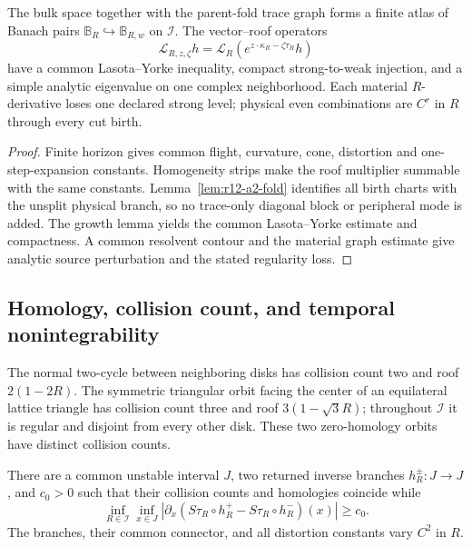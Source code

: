 \begin{theorem}
\label{thm:r12-a2-bundle}
The bulk space together with the parent-fold trace graph forms a finite
atlas of Banach pairs $\mathbb B_R\hookrightarrow\mathbb B_{R,w}$ on
$\mathcal I$.  The vector--roof operators
\[
 \mathcal L_{R,z,\zeta}h
 =\mathcal L_R(e^{z\cdot\kappa_R-\zeta\tau_R}h)
\]
have a common Lasota--Yorke inequality, compact strong-to-weak injection, and
a simple analytic eigenvalue on one complex neighborhood.  Each material
$R$-derivative loses one declared strong level; physical even combinations
are $C^r$ in $R$ through every cut birth.
\end{theorem}

\begin{proof}
Finite horizon gives common flight, curvature, cone, distortion and
one-step-expansion constants.  Homogeneity strips make the roof multiplier
summable with the same constants.  Lemma~\ref{lem:r12-a2-fold} identifies all
birth charts with the unsplit physical branch, so no trace-only diagonal block
or peripheral mode is added.  The growth lemma yields the common
Lasota--Yorke estimate and compactness.  A common resolvent contour and the
material graph estimate give analytic source perturbation and the stated
regularity loss.
\end{proof}

\subsection{Homology, collision count, and temporal nonintegrability}

The normal two-cycle between neighboring disks has collision count two and
roof $2(1-2R)$.  The symmetric triangular orbit facing the center of an
equilateral lattice triangle has collision count three and roof
$3(1-\sqrt3R)$; throughout $\mathcal I$ it is regular and disjoint from every
other disk.  These two zero-homology orbits have distinct collision counts.

\begin{lemma}
\label{lem:r12-a2-uni}
There are a common unstable interval $J$, two returned inverse branches
$h_R^\pm:J\to J$, and $c_0>0$ such that their collision counts and homologies
coincide while
\[
 \inf_{R\in\mathcal I}\inf_{x\in J}
 \left|\partial_x(S\tau_R\circ h_R^+ -S\tau_R\circ h_R^-)(x)\right|
 \ge c_0.
\]
The branches, their common connector, and all distortion constants vary
$C^2$ in $R$.
\end{lemma}

